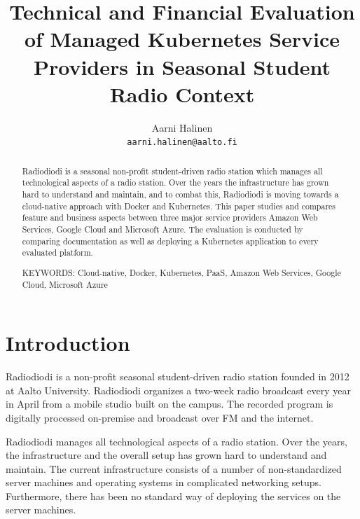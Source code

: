 \documentclass[article]{aaltoseries}
\begin{document}
 

\title{Technical and Financial Evaluation of Managed Kubernetes Service Providers in Seasonal Student Radio Context}

\author{Aarni Halinen
\\\textnormal{\texttt{aarni.halinen@aalto.fi}}}


\maketitle


\begin{abstract}

Radiodiodi is a seasonal non-profit student-driven radio station which manages all technological aspects of a radio station. Over the years the infrastructure has grown hard to understand  and  maintain, and to combat this, Radiodiodi is  moving towards a cloud-native approach with Docker and Kubernetes. This paper studies and compares feature and business aspects between three major service providers Amazon Web Services, Google Cloud and Microsoft Azure. The evaluation is conducted by comparing documentation as well as deploying a Kubernetes application to every evaluated platform.

\vspace{3mm}
\noindent KEYWORDS: Cloud-native, Docker, Kubernetes, PaaS, Amazon Web Services, Google Cloud, Microsoft Azure

\end{abstract}

\newpage



\section{Introduction}

Radiodiodi is a  non-profit seasonal student-driven radio station founded in 2012 at Aalto University. Radiodiodi organizes a two-week radio broadcast every year in April from a mobile studio built on the campus. The recorded program is digitally processed on-premise and broadcast over FM and the internet.

Radiodiodi manages all technological aspects of a radio station.  Over the years, the infrastructure and the overall setup has grown hard to understand and maintain. The current infrastructure consists of a number of non-standardized server machines and operating systems in complicated networking setups. Furthermore, there has been no standard way of deploying the services on the server machines.
\end{document}
